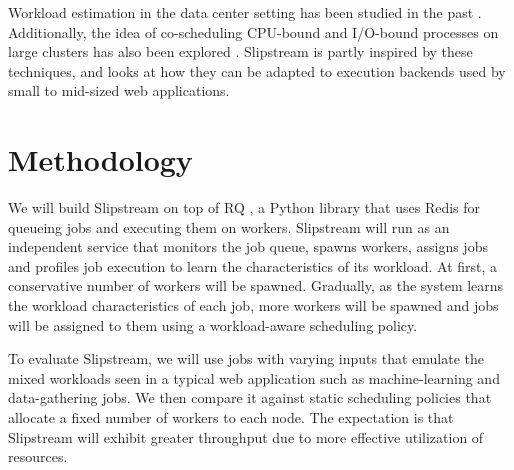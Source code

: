 \documentclass{proc}
\begin{document}
Workload estimation in the data center setting has been studied in the past
\cite{186175, 8478443, 5279616}. Additionally, the idea of co-scheduling
CPU-bound and I/O-bound processes on large clusters has also been explored
\cite{5279616, 10.1109/TPDS.2003.1206505}. Slipstream is partly inspired by
these techniques, and looks at how they can be adapted to execution backends
used by small to mid-sized web applications.

\section{Methodology}

We will build Slipstream on top of RQ \cite{RQ}, a Python library that uses Redis
for queueing jobs and executing them on workers. Slipstream will run as an
independent service that monitors the job queue, spawns workers, assigns jobs
and profiles job execution to learn the characteristics of its workload. At
first, a conservative number of workers will be spawned. Gradually, as the
system learns the workload characteristics of each job, more workers will be
spawned and jobs will be assigned to them using a workload-aware scheduling
policy.

To evaluate Slipstream, we will use jobs with varying inputs that emulate the
mixed workloads seen in a typical web application such as machine-learning and
data-gathering jobs. We then compare it against static scheduling policies that
allocate a fixed number of workers to each node. The expectation is that
Slipstream will exhibit greater throughput due to more effective utilization of
resources.

\printbibliography
\end{document}
